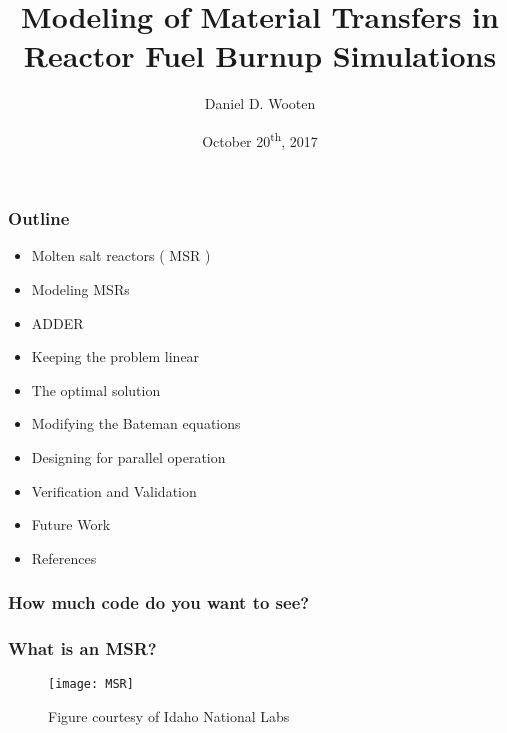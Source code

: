 \documentclass{beamer}
\title[Modeling of Material Transfers in MSRs]{Modeling of Material Transfers in  Reactor Fuel Burnup Simulations}
\author{Daniel D. Wooten}
\institute{UC Berkeley}
\date{October 20\textsuperscript{th}, 2017}
\begin{document}
\frame{\titlepage}

\begin{frame}

\frametitle{Outline}

    \begin{itemize}
        \item Molten salt reactors ( MSR ) 
        \item Modeling MSRs
        \item ADDER
        \item Keeping the problem linear
        \item The optimal solution
        \item Modifying the Bateman equations
        \item Designing for parallel operation
        \item Verification and Validation
        \item Future Work
        \item References
    \end{itemize}

\end{frame}

\begin{frame}
\frametitle{How much code do you want to see?}

\end{frame}

\begin{frame}
\frametitle{What is an MSR?}

    \begin{figure}
        \centering
        \texttt{[image: MSR]}
        \caption{Figure courtesy of Idaho National Labs}
        \label{fig:msr}
    \end{figure}

\end{frame}
\end{document}
